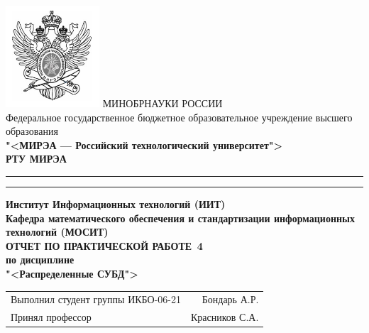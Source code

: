 \begin{titlepage}
	\thispagestyle{fancy}
	\renewcommand{\headrulewidth}{0pt}

	\centering
	\includegraphics[scale=0.5]{../res/logo} \break %
	МИНОБРНАУКИ РОССИИ\\
	Федеральное государственное бюджетное образовательное учреждение
	высшего образования\\
	\textbf{"<МИРЭА --- Российский технологический университет">}\\
	\textbf{РТУ МИРЭА}\\
	\bigskip \hrule \smallskip \hrule
	\vfill
	\vfill
	\textbf{Институт Информационных технологий (ИИТ)}\\
	\textbf{Кафедра математического обеспечения
		и стандартизации информационных технологий (МОСИТ)}\\
	\vfill
	\vfill
	\textbf{ОТЧЕТ ПО ПРАКТИЧЕСКОЙ РАБОТЕ \No\,4}\\
	\textbf{по дисциплине}\\
	\textbf{"<Распределенные СУБД">}
	\vfill
	\vfill
	\vfill
	\vfill
	\begin{tabular}{lr}
		Выполнил студент группы ИКБО-06-21 & Бондарь А.Р.\\
		Принял профессор & Красников С.А.\\
	\end{tabular}
	\vfill
	\vfill
	\vfill
\end{titlepage}
\setcounter{page}{2}
\clearpage

